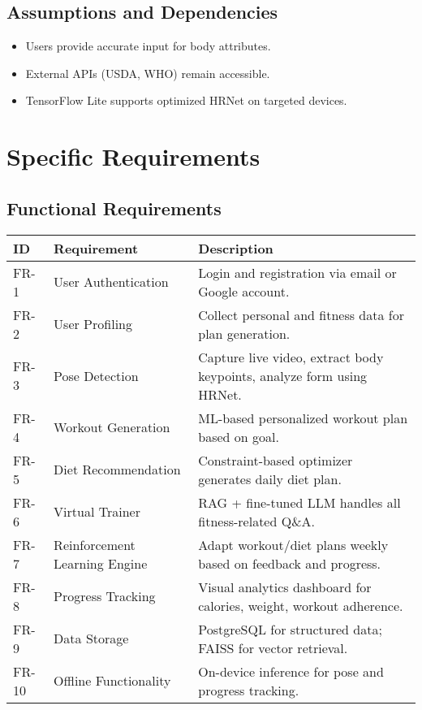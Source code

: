 \documentclass[12pt,a4paper]{article}
\begin{document}
\subsection{Assumptions and Dependencies}
\begin{itemize}[leftmargin=*]
    \item Users provide accurate input for body attributes.
    \item External APIs (USDA, WHO) remain accessible.
    \item TensorFlow Lite supports optimized HRNet on targeted devices.
\end{itemize}

\newpage
\section{Specific Requirements}

\subsection{Functional Requirements}
\begin{table}[h!]
\centering
\small
\begin{tabular}{>{\raggedright\arraybackslash}p{1.5cm}>{\raggedright\arraybackslash}p{3.5cm}>{\raggedright\arraybackslash}p{8cm}}
\toprule
\textbf{ID} & \textbf{Requirement} & \textbf{Description} \\
\midrule
FR-1 & User Authentication & Login and registration via email or Google account. \\
FR-2 & User Profiling & Collect personal and fitness data for plan generation. \\
FR-3 & Pose Detection & Capture live video, extract body keypoints, analyze form using HRNet. \\
FR-4 & Workout Generation & ML-based personalized workout plan based on goal. \\
FR-5 & Diet Recommendation & Constraint-based optimizer generates daily diet plan. \\
FR-6 & Virtual Trainer & RAG + fine-tuned LLM handles all fitness-related Q\&A. \\
FR-7 & Reinforcement Learning Engine & Adapt workout/diet plans weekly based on feedback and progress. \\
FR-8 & Progress Tracking & Visual analytics dashboard for calories, weight, workout adherence. \\
FR-9 & Data Storage & PostgreSQL for structured data; FAISS for vector retrieval. \\
FR-10 & Offline Functionality & On-device inference for pose and progress tracking. \\
\bottomrule
\end{tabular}
\end{table}
\end{document}
